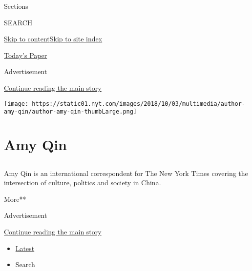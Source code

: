 Sections

SEARCH

\protect\hyperlink{site-content}{Skip to
content}\protect\hyperlink{site-index}{Skip to site index}

\href{https://myaccount.nytimes.com/auth/login?response_type=cookie\&client_id=vi}{}

\href{https://www.nytimes.com/section/todayspaper}{Today's Paper}

Advertisement

\protect\hyperlink{after-top}{Continue reading the main story}

\texttt{[image: https://static01.nyt.com/images/2018/10/03/multimedia/author-amy-qin/author-amy-qin-thumbLarge.png]}

\hypertarget{amy-qin}{%
\section{Amy Qin}\label{amy-qin}}

\subsection{}

Amy Qin is an international correspondent for The New York Times
covering the intersection of culture, politics and society in China.

More**

Advertisement

\protect\hyperlink{after-mid1}{Continue reading the main story}

\begin{itemize}
\tightlist
\item
  \protect\hyperlink{stream-panel}{Latest}
\item
  Search
\end{itemize}

